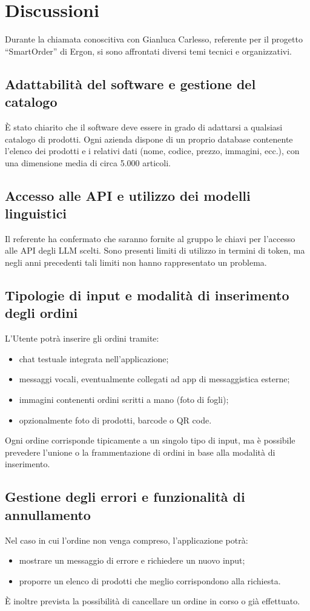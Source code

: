 \documentclass[a4paper,12pt]{article}
\begin{document}
\section{Discussioni}
Durante la chiamata conoscitiva con Gianluca Carlesso, referente per il progetto “SmartOrder” di Ergon, si sono affrontati diversi temi tecnici e organizzativi.

\subsection{Adattabilità del software e gestione del catalogo}
È stato chiarito che il software deve essere in grado di adattarsi a qualsiasi catalogo di prodotti.  
Ogni azienda dispone di un proprio database contenente l’elenco dei prodotti e i relativi dati (nome, codice, prezzo, immagini, ecc.), con una dimensione media di circa 5.000 articoli.

\subsection{Accesso alle API e utilizzo dei modelli linguistici}
Il referente ha confermato che saranno fornite al gruppo le chiavi per l’accesso alle API degli LLM scelti.  
Sono presenti limiti di utilizzo in termini di token, ma negli anni precedenti tali limiti non hanno rappresentato un problema.

\subsection{Tipologie di input e modalità di inserimento degli ordini}
L’Utente potrà inserire gli ordini tramite:
\begin{itemize}
    \item chat testuale integrata nell’applicazione;
    \item messaggi vocali, eventualmente collegati ad app di messaggistica esterne;
    \item immagini contenenti ordini scritti a mano (foto di fogli);
    \item opzionalmente foto di prodotti, barcode o QR code.
\end{itemize}
Ogni ordine corrisponde tipicamente a un singolo tipo di input, ma è possibile prevedere l’unione o la frammentazione di ordini in base alla modalità di inserimento.

\subsection{Gestione degli errori e funzionalità di annullamento}
Nel caso in cui l’ordine non venga compreso, l’applicazione potrà:
\begin{itemize}
    \item mostrare un messaggio di errore e richiedere un nuovo input;
    \item proporre un elenco di prodotti che meglio corrispondono alla richiesta.
\end{itemize}
È inoltre prevista la possibilità di cancellare un ordine in corso o già effettuato.
\end{document}
